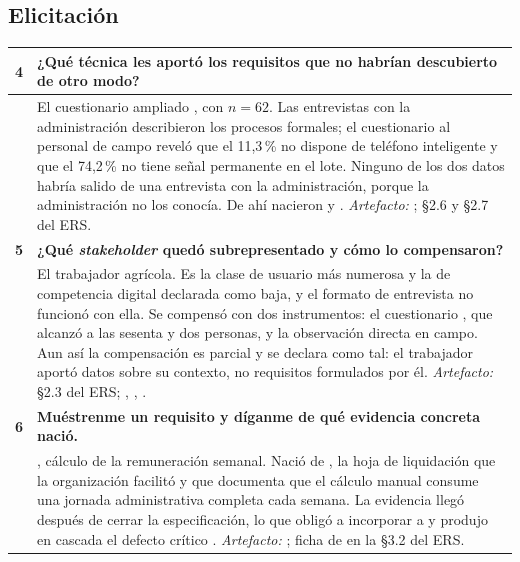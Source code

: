 \subsection*{Elicitación}

\begin{longtable}{|C{0.7cm}|L{14.6cm}|}
\hline
{}\textbf{4} & \textbf{¿Qué técnica les aportó los requisitos que no habrían descubierto de otro modo?}\\ \hline
& El cuestionario ampliado , con $n=62$. Las entrevistas con la administración describieron los procesos formales; el cuestionario al personal de campo reveló que el 11,3\,\% no dispone de teléfono inteligente y que el 74,2\,\% no tiene señal permanente en el lote. Ninguno de los dos datos habría salido de una entrevista con la administración, porque la administración no los conocía. De ahí nacieron  y . \newline \emph{Artefacto:} ; \S2.6 y \S2.7 del ERS.\\ \hline
{}\textbf{5} & \textbf{¿Qué \emph{stakeholder} quedó subrepresentado y cómo lo compensaron?}\\ \hline
& El trabajador agrícola. Es la clase de usuario más numerosa y la de competencia digital declarada como baja, y el formato de entrevista no funcionó con ella. Se compensó con dos instrumentos: el cuestionario , que alcanzó a las sesenta y dos personas, y la observación directa en campo. Aun así la compensación es parcial y se declara como tal: el trabajador aportó datos sobre su contexto, no requisitos formulados por él. \newline \emph{Artefacto:} \S2.3 del ERS; , , .\\ \hline
{}\textbf{6} & \textbf{Muéstrenme un requisito y díganme de qué evidencia concreta nació.}\\ \hline
& , cálculo de la remuneración semanal. Nació de , la hoja de liquidación que la organización facilitó y que documenta que el cálculo manual consume una jornada administrativa completa cada semana. La evidencia llegó después de cerrar la especificación, lo que obligó a incorporar  a  y produjo en cascada el defecto crítico . \newline \emph{Artefacto:} ; ficha de  en la \S3.2 del ERS.\\ \hline
\end{longtable}

